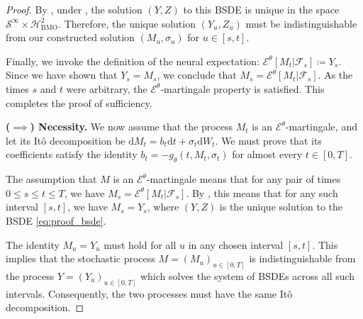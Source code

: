 \documentclass[qian]{imsart}
\newcommand{\Fcal}{\mathcal{F}}
\newcommand{\cEneutheta}{\mathcal{E}^{\theta}}
\newcommand{\dd}{\mathrm{d}}
\theoremstyle{plain}
\theoremstyle{definition}
\begin{document}
\begin{proof}
By , under , the solution $(Y,Z)$ to this BSDE is unique in the space $\mathcal{S}^\infty \times \mathcal{H}^2_{\mathrm{BMO}}$. Therefore, the unique solution $(Y_u, Z_u)$ must be indistinguishable from our constructed solution $(M_u, \sigma_u)$ for $u \in [s,t]$.

Finally, we invoke the definition of the neural expectation: $\cEneutheta[M_t|\Fcal_s] \coloneqq Y_s$. Since we have shown that $Y_s = M_s$, we conclude that $M_s = \cEneutheta[M_t|\Fcal_s]$. As the times $s$ and $t$ were arbitrary, the $\cEneutheta$-martingale property is satisfied. This completes the proof of sufficiency.

\vspace{1em}
\textbf{($\implies$) Necessity.}
We now assume that the process $M_t$ is an $\cEneutheta$-martingale, and let its Itô decomposition be $\dd M_t = b_t \dd t + \sigma_t \dd W_t$. We must prove that its coefficients satisfy the identity $b_t = -g_\theta(t, M_t, \sigma_t)$ for almost every $t \in [0,T]$.

The assumption that $M$ is an $\cEneutheta$-martingale means that for any pair of times $0 \le s \le t \le T$, we have $M_s = \cEneutheta[M_t | \Fcal_s]$. By , this means that for any such interval $[s,t]$, we have $M_s = Y_s$, where $(Y,Z)$ is the unique solution to the BSDE \eqref{eq:proof_bsde}.

The identity $M_u = Y_u$ must hold for all $u$ in any chosen interval $[s,t]$. This implies that the stochastic process $M=(M_u)_{u\in[0,T]}$ is indistinguishable from the process $Y=(Y_u)_{u\in[0,T]}$ which solves the system of BSDEs across all such intervals. Consequently, the two processes must have the same Itô decomposition.


\end{proof}
\end{document}

